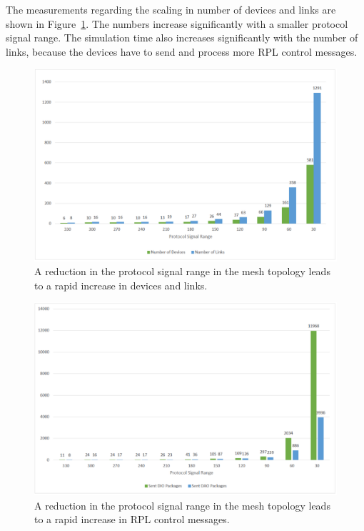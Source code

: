 \documentclass[english,version-2019-11]{uzl-thesis}
\begin{document}
The measurements regarding the scaling in number of devices and links are shown in Figure~\ref{figure_evaluation_meshPerf_links}. The numbers increase significantly with a smaller protocol signal range. The simulation time also increases significantly with the number of links, because the devices have to send and process more RPL control messages.
\begin{figure}[htpb]
  \centering
  \includegraphics[scale=0.5]{figure_evaluation_meshPerf_links.pdf}
  \caption{A reduction in the protocol signal range in the mesh topology leads to a rapid increase in devices and links.}
  \label{figure_evaluation_meshPerf_links}
\end{figure}
\begin{figure}[htpb]
  \centering
  \includegraphics[scale=0.5]{figure_evaluation_meshPerf_time.pdf}
  \caption{A reduction in the protocol signal range in the mesh topology leads to a rapid increase in RPL control messages.}
  \label{figure_evaluation_meshPerf_time}
\end{figure}
\end{document}
